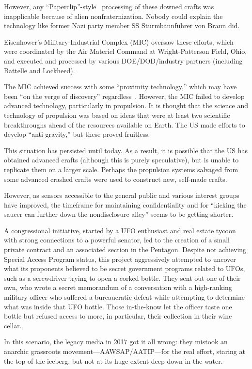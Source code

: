 However, any ``Paperclip''-style~\cite{Jacobsen2014} processing of these downed crafts was inapplicable because of alien nonfraternization. Nobody could explain the technology like former Nazi party member SS Sturmbannf\"uhrer von Braun did.


Eisenhower's Military-Industrial Complex (MIC) oversaw these efforts, which were coordinated by the Air Materiel Command at Wright-Patterson Field, Ohio, and executed and processed by various DOE/DOD/industry partners (including Battelle and Lockheed).

The MIC achieved success with some ``proximity technology,'' which may have been ``on the verge of discovery'' regardless~\cite{Corso,Corso1998Jun}. However, the MIC failed to develop advanced technology, particularly in propulsion. It is thought that the science and technology of propulsion was based on ideas that were at least two scientific breakthroughs ahead of the resources available on Earth. The US made efforts to develop ``anti-gravity,'' but these proved fruitless.

This situation has persisted until today. As a result, it is possible that the US has obtained advanced crafts (although this is purely speculative), but is unable to replicate them on a larger scale. Perhaps the propulsion systems salvaged from some advanced crashed crafts were used to construct new, self-made crafts.

However, as sensors accessible to the general public and various interest groups have improved, the timeframe
for maintaining confidentiality and for ``kicking the saucer can further down the nondisclosure alley'' seems to be getting shorter.

A congressional initiative, started by a UFO enthusiast and real estate tycoon with strong connections to a powerful senator, led to the creation of a small private contract and an associated section in the Pentagon. Despite not achieving Special Access Program status, this project aggressively attempted to uncover what its proponents believed to be secret government programs related to UFOs, such as a screwdriver trying to open a corked bottle. They sent out one of their own, who wrote a secret memorandum of a conversation with a high-ranking military officer who suffered a bureaucratic defeat while attempting to determine what was inside that UFO bottle. Those in-the-know let the officer taste one bottle but refused access to more, in particular, their collection in their wine cellar.

In this scenario, the legacy media in 2017 got it all wrong: they mistook an anarchic grassroots movement---AAWSAP/AATIP---for the real effort, staring at the top of the iceberg, but not at its huge extent deep down in the water.

